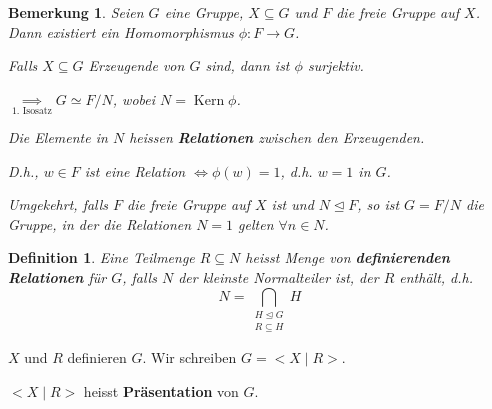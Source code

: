 \documentclass{article}
\theoremstyle{plain}
\newtheorem{definition}{Definition}
\newtheorem{bemerkung}{Bemerkung}
\renewcommand{\ker}{\mathop{\mathrm{Kern}}}
\newcommand{\defn}[1]{\textbf{#1}}
\newcommand{\normal}{\trianglelefteq}
\newcommand{\zykl}[1]{{<}{#1}{>}}
\newcommand{\iso}{\simeq}
\begin{document}
\begin{bemerkung}
    Seien $G$ eine Gruppe, $X\subseteq G$ und $F$ die freie Gruppe auf $X$. Dann existiert ein Homomorphismus $\phi\colon F\to G$.

    Falls $X\subseteq G$ Erzeugende von $G$ sind, dann ist $\phi$ surjektiv.

    $\underset{\text{1. Isosatz}}{\implies} G \iso F/N$, wobei $N=\ker \phi$.
    
    Die Elemente in $N$ heissen \defn{Relationen} zwischen den Erzeugenden. 
    
    D.h., $w\in F$ ist eine Relation $\Leftrightarrow \phi(w)=1$, d.h. $w=1$ in $G$.

    Umgekehrt, falls $F$ die freie Gruppe auf $X$ ist und $N \normal F$, so ist $G=F/N$ die Gruppe, in der die Relationen $N=1$ gelten $\forall n\in N$.
\end{bemerkung}
\begin{definition}
    Eine Teilmenge $R\subseteq N$ heisst Menge von \defn{definierenden Relationen} für $G$, falls $N$ der kleinste Normalteiler ist, der $R$ enthält, d.h. $$N=\bigcap_{\substack{H\normal G\\ R\subseteq H}}H$$
\end{definition}
$X$ und $R$ definieren $G$. Wir schreiben $G=\zykl{X \mid R}$.

$\zykl{X \mid R}$ heisst \defn{Präsentation} von $G$.
\end{document}
